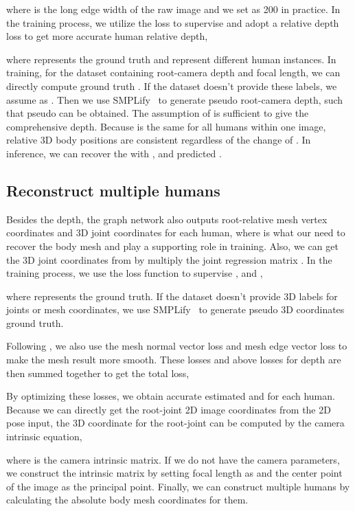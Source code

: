 \documentclass[runningheads]{llncs}
\begin{document}
where  is the long edge width of the raw image and we set  as 200 in practice.
In the training process, we utilize the  loss to supervise  and adopt a relative depth loss to get more accurate human relative depth,

where  represents the ground truth and  represent different human instances. 
In training, for the dataset containing root-camera depth and focal length, we can directly compute ground truth . 
If the dataset doesn't provide these labels, we assume  as .  
Then we use SMPLify~\cite{pavlakos2019expressive} to generate pseudo root-camera depth, such that pseudo  can be obtained.
The assumption of  is sufficient to give the comprehensive depth. Because  is the same for all humans within one image, relative 3D body positions are consistent regardless of the change of .
In inference, we can recover the  with ,  and predicted .

\subsection{Reconstruct multiple humans}\label{subsection:mesh}
Besides the depth, the graph network also outputs root-relative mesh vertex coordinates  and 3D joint coordinates  for each human, where  is what our need to recover the body mesh and  play a supporting role in training. Also, we can get the 3D joint coordinates from  by multiply the joint regression matrix .
In the training process, we use the  loss function to supervise ,  and ,

where  represents the ground truth. If the dataset doesn't provide 3D labels for joints or mesh coordinates, we use SMPLify~\cite{pavlakos2019expressive} to generate pseudo 3D coordinates ground truth.

Following \cite{wang2018pixel2mesh}, we also use the mesh normal vector loss  and mesh edge  vector loss  to make the mesh result more smooth.
These losses and above losses for depth are then summed together to get the total loss,


By optimizing these losses, we obtain accurate estimated  and  for each human. Because we can directly get the root-joint 2D image coordinates  from the 2D pose input, the 3D coordinate for the root-joint  can be computed by the camera intrinsic equation,

where  is the camera intrinsic matrix. If we do not have the camera parameters, we construct the intrinsic matrix by setting focal length as  and the center point of the image as the principal point. Finally, we can construct multiple humans by calculating the absolute body mesh coordinates for them. 
\end{document}
